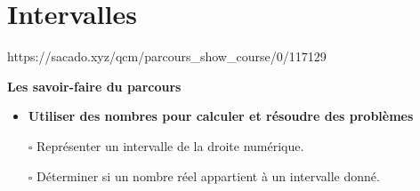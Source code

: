 \chapter{Intervalles}
{https://sacado.xyz/qcm/parcours_show_course/0/117129}
{


 \begin{CpsCol}
\textbf{Les savoir-faire du parcours}
 \begin{itemize}
 \item \textbf{Utiliser des nombres pour calculer et résoudre des problèmes}
	\item[$\square$] Représenter un intervalle de la droite numérique. 
	\item[$\square$]  Déterminer si un nombre réel appartient à un intervalle donné.
 \end{itemize}
 \end{CpsCol}

}




